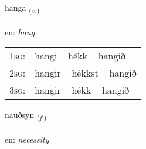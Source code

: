\documentclass[frontgrid, backgrid]{flacards}\usepackage[]{graphicx}\usepackage[]{color}
\begin{document}
\renewcommand{\flhead}{\vskip5pt \fboxsep=0pt {\small\bfseries\footnotesize Sagnorð | Verb}}
\renewcommand{\fcfoot}{\vskip5pt \fboxsep=0pt \hspace{2pt}{\small\bfseries\footnotesize 2K}}

\renewcommand{\blhead}{\vskip5pt {\small\bfseries\footnotesize Sagnorð | Verb }}
\renewcommand{\bcfoot}{\vskip5pt \hspace{2pt}{\small\bfseries\footnotesize 2K}}


{hanga \small{\textsubscript{(\textit{v.})}} \\[1ex] %
\textphonetic{[hauŋka]} \\
en: \emph{hang} \\  [2ex]
\renewcommand*{\arraystretch}{0.8}
\begin{tabular}{p{1cm}l}
\textsc{1sg}: & hangi -- hékk -- hangið \\ 
\textsc{2sg}: & hangir -- hékkst -- hangið \\ 
\textsc{3sg}: & hangir -- hékk -- hangið \\ 
\end{tabular}
}

\renewcommand{\flhead}{\vskip5pt \fboxsep=0pt {\small\bfseries\footnotesize Nafnorð | Noun}}
\renewcommand{\fcfoot}{\vskip5pt \fboxsep=0pt \hspace{2pt}{\small\bfseries\footnotesize 2K}}

\renewcommand{\blhead}{\vskip5pt {\small\bfseries\footnotesize Nafnorð | Noun }}
\renewcommand{\bcfoot}{\vskip5pt \hspace{2pt}{\small\bfseries\footnotesize 2K}}


{nauðsyn \small{\textsubscript{(\textit{f.})}} \\[1ex] %
\textphonetic{[nœiðsɪn]} \\
en: \emph{necessity} \\  [2ex]
\renewcommand*{\arraystretch}{0.8}
}
\end{document}
